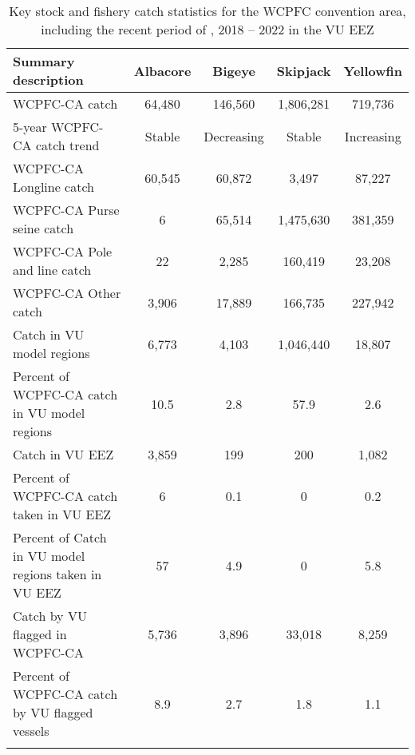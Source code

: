 \begin{longtable}{lcccc}
\caption{Key stock and fishery catch statistics for the WCPFC convention area, including the recent period of , 2018 -- 2022 in the VU EEZ} \\ 
  \hline
Summary description & Albacore & Bigeye & Skipjack & Yellowfin \\ 
  \hline
WCPFC-CA catch & 64,480 & 146,560 & 1,806,281 & 719,736 \\ 
  5-year WCPFC-CA catch trend & Stable & Decreasing & Stable & Increasing \\ 
  WCPFC-CA Longline catch & 60,545 & 60,872 & 3,497 & 87,227 \\ 
  WCPFC-CA Purse seine catch & 6 & 65,514 & 1,475,630 & 381,359 \\ 
  WCPFC-CA Pole and line catch & 22 & 2,285 & 160,419 & 23,208 \\ 
  WCPFC-CA Other catch & 3,906 & 17,889 & 166,735 & 227,942 \\ 
  Catch in VU model regions & 6,773 & 4,103 & 1,046,440 & 18,807 \\ 
  Percent of WCPFC-CA catch in VU model regions & 10.5 & 2.8 & 57.9 & 2.6 \\ 
   \hline
Catch in VU EEZ & 3,859 & 199 & 200 & 1,082 \\ 
  Percent of WCPFC-CA catch taken in VU EEZ & 6 & 0.1 & 0 & 0.2 \\ 
  Percent of Catch in VU model regions taken in VU EEZ & 57 & 4.9 & 0 & 5.8 \\ 
  Catch by VU flagged in WCPFC-CA & 5,736 & 3,896 & 33,018 & 8,259 \\ 
  Percent of WCPFC-CA catch by VU flagged vessels & 8.9 & 2.7 & 1.8 & 1.1 \\ 
  \hline
\label{cat_sum_tab}
\end{longtable}
